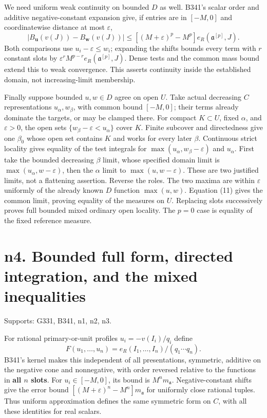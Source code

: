 \documentclass[
  11pt,
]{article}
\begin{document}
We need uniform weak continuity on bounded \(D\) as well. B341's scalar
order and additive negative-constant expansion give, if entries are in
\([-M,0]\) and coordinatewise distance at most \(\varepsilon\),
\[|B_{\boldsymbol u}(v(J))-B_{\boldsymbol w}(v(J))|\le[(M+\varepsilon)^p-M^p]e_R(\mathfrak a^{[p]},J).\tag{11}\]
Both comparisons use \(u_i-\varepsilon\le w_i\); expanding the shifts
bounds every term with \(r\) constant slots by
\(\varepsilon^r M^{p-r}e_R(\mathfrak a^{[p]},J)\). Dense tests and the
common mass bound extend this to weak convergence. This asserts
continuity inside the established domain, not increasing-limit
membership.

Finally suppose bounded \(u,w\in D\) agree on open \(U\). Take actual
decreasing \(C\) representations \(u_\alpha,w_\beta\), with common bound
\([-M,0]\); their terms already dominate the targets, or may be clamped
there. For compact \(K\subset U\), fixed \(\alpha\), and
\(\varepsilon>0\), the open sets \(\{w_\beta-\varepsilon<u_\alpha\}\)
cover \(K\). Finite subcover and directedness give one \(\beta_0\) whose
open set contains \(K\) and works for every later \(\beta\). Continuous
strict locality gives equality of the test integrals for
\(\max(u_\alpha,w_\beta-\varepsilon)\) and \(u_\alpha\). First take the
bounded decreasing \(\beta\) limit, whose specified domain limit is
\(\max(u_\alpha,w-\varepsilon)\), then the \(\alpha\) limit to
\(\max(u,w-\varepsilon)\). These are two justified limits, not a
flattening assertion. Reverse the roles. The two maxima are within
\(\varepsilon\) uniformly of the already known \(D\) function
\(\max(u,w)\). Equation (11) gives the common limit, proving equality of
the measures on \(U\). Replacing slots successively proves full bounded
mixed ordinary open locality. The \(p=0\) case is equality of the fixed
reference measure.

\section{n4. Bounded full form, directed integration, and the mixed
inequalities}\label{n4.-bounded-full-form-directed-integration-and-the-mixed-inequalities}

Supports: G331, B341, n1, n2, n3.

For rational primary-or-unit profiles \(u_i=-v(I_i)/q_i\) define
\[F(u_1,\ldots,u_n)=e_R(I_1,\ldots,I_n)/(q_1\cdots q_n).\tag{12}\]
B341's kernel makes this independent of all presentations, symmetric,
additive on the negative cone and nonnegative, with order reversed
relative to the functions in \textbf{all \(n\) slots}. For
\(u_i\in[-M,0]\), its bound is \(M^n m_{\mathfrak a}\).
Negative-constant shifts give the error bound
\([(M+\varepsilon)^n-M^n]m_{\mathfrak a}\) for uniformly close rational
tuples. Thus uniform approximation defines the same symmetric form on
\(C\), with all these identities for real scalars.
\end{document}
